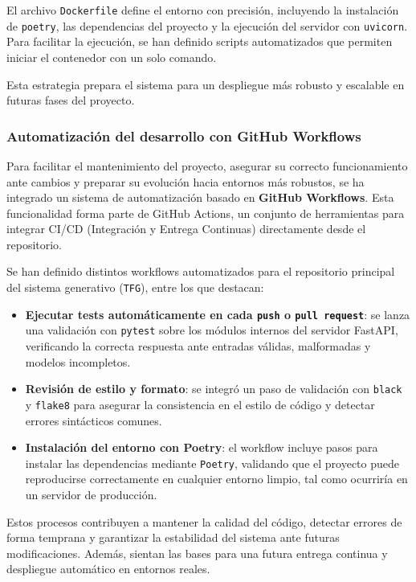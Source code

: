 El archivo \texttt{Dockerfile} define el entorno con precisión, incluyendo la instalación de \texttt{poetry}, las dependencias del proyecto y la ejecución del servidor con \texttt{uvicorn}. Para facilitar la ejecución, se han definido scripts automatizados que permiten iniciar el contenedor con un solo comando.

Esta estrategia prepara el sistema para un despliegue más robusto y escalable en futuras fases del proyecto.

\subsubsection{Automatización del desarrollo con GitHub Workflows}

Para facilitar el mantenimiento del proyecto, asegurar su correcto funcionamiento ante cambios y preparar su evolución hacia entornos más robustos, se ha integrado un sistema de automatización basado en \textbf{GitHub Workflows}. Esta funcionalidad forma parte de GitHub Actions, un conjunto de herramientas para integrar CI/CD (Integración y Entrega Continuas) directamente desde el repositorio.

Se han definido distintos workflows automatizados para el repositorio principal del sistema generativo (\texttt{TFG}), entre los que destacan:

\begin{itemize}
    \item \textbf{Ejecutar tests automáticamente en cada \texttt{push} o \texttt{pull request}}: se lanza una validación con \texttt{pytest} sobre los módulos internos del servidor FastAPI, verificando la correcta respuesta ante entradas válidas, malformadas y modelos incompletos.
    
    \item \textbf{Revisión de estilo y formato}: se integró un paso de validación con \texttt{black} y \texttt{flake8} para asegurar la consistencia en el estilo de código y detectar errores sintácticos comunes.

    \item \textbf{Instalación del entorno con Poetry}: el workflow incluye pasos para instalar las dependencias mediante \texttt{Poetry}, validando que el proyecto puede reproducirse correctamente en cualquier entorno limpio, tal como ocurriría en un servidor de producción.
\end{itemize}

Estos procesos contribuyen a mantener la calidad del código, detectar errores de forma temprana y garantizar la estabilidad del sistema ante futuras modificaciones. Además, sientan las bases para una futura entrega continua y despliegue automático en entornos reales.


